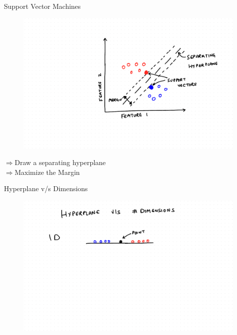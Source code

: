 \documentclass{beamer}
\begin{document}
\begin{frame}{Support Vector Machines}
\begin{figure}
\begin{overprint}
    \includegraphics[scale = 0.4]{SVM/Svm-4.pdf}
    
    \end{overprint}
\end{figure}


{
  $\Rightarrow$Draw a separating hyperplane\\
 
}
{
  $\Rightarrow$Maximize the Margin
}

\end{frame}

\begin{frame}{Hyperplane v/s Dimensions}
\begin{figure}
    \includegraphics[width=\linewidth]{./SVM/Svm-5.pdf}  
\end{figure}
\end{frame}
\end{document}
